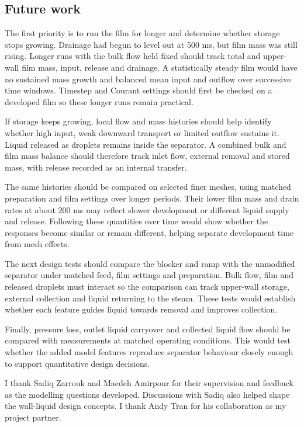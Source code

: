 \documentclass[12pt]{article}
\begin{document}
\subsection{Future work}\label{future-work}

The first priority is to run the film for longer and determine whether storage stops growing. Drainage had begun to level out at 500 ms, but film mass was still rising. Longer runs with the bulk flow held fixed should track total and upper-wall film mass, input, release and drainage. A statistically steady film would have no sustained mass growth and balanced mean input and outflow over successive time windows. Timestep and Courant settings should first be checked on a developed film so these longer runs remain practical.

If storage keeps growing, local flow and mass histories should help identify whether high input, weak downward transport or limited outflow sustains it. Liquid released as droplets remains inside the separator. A combined bulk and film mass balance should therefore track inlet flow, external removal and stored mass, with release recorded as an internal transfer.

The same histories should be compared on selected finer meshes, using matched preparation and film settings over longer periods. Their lower film mass and drain rates at about 200 ms may reflect slower development or different liquid supply and release. Following these quantities over time would show whether the responses become similar or remain different, helping separate development time from mesh effects.

The next design tests should compare the blocker and ramp with the unmodified separator under matched feed, film settings and preparation. Bulk flow, film and released droplets must interact so the comparison can track upper-wall storage, external collection and liquid returning to the steam. These tests would establish whether each feature guides liquid towards removal and improves collection.

Finally, pressure loss, outlet liquid carryover and collected liquid flow should be compared with measurements at matched operating conditions. This would test whether the added model features reproduce separator behaviour closely enough to support quantitative design decisions.

\clearpage{}
I thank Sadiq Zarrouk and Maedeh Amirpour for their supervision and feedback as the modelling questions developed. Discussions with Sadiq also helped shape the wall-liquid design concepts. I thank Andy Tran for his collaboration as my project partner.
\end{document}
